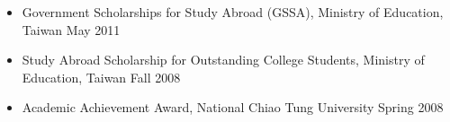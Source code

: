 \documentclass[10pt]{article}
\newenvironment{innerlist}[1][\enskip\textbullet]%
        {\begin{itemize}[#1,leftmargin=*,parsep=0pt,itemsep=0pt,topsep=0pt,partopsep=0pt]}
        {\end{itemize}}
\newcommand{\halfblankline}{\quad\vspace{-0.5\baselineskip}\pagebreak[3]}
\begin{document}
\begin{itemize}[leftmargin=0pt,parsep=3pt,itemsep=0pt,topsep=0pt,partopsep=0pt]
\item[] Government Scholarships for Study Abroad (GSSA), Ministry of Education, Taiwan \hfill May 2011
\item[] Study Abroad Scholarship for Outstanding College Students, Ministry of Education, Taiwan \hfill Fall 2008
\item[] Academic Achievement Award, National Chiao Tung University \hfill Spring 2008
\end{itemize}
%
%
%
%
\end{document}
